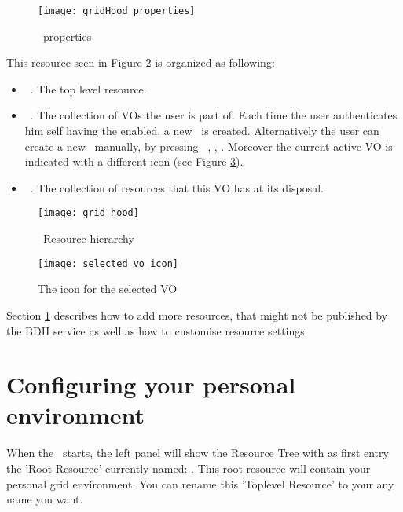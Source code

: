  \begin{figure}[htbp]
  \centerline{\texttt{[image: gridHood\_properties]}}
  \caption{\GridHood\ properties}
  \label{fig:gridHood_properties}
 \end{figure}

 This resource seen in Figure \ref{fig:grid_hood} is organized as following: 
\begin{itemize}
  \item \GridHood\ . The top level resource.
  \item \VOGroup\ . The collection of VOs the user is part of. Each time the user authenticates 
                    him self having the  enabled, a new \VOGroup\ is created. 
                    Alternatively the user can create a new \VOGroup\ manually, by pressing \rightclick\ ,
                     , . Moreover the current active VO is indicated with a different 
                     icon (see Figure \ref{fig:selected_vo_icon}).
  \item \VO\ . The collection of resources that this VO has at its disposal.
\end{itemize} 

 \begin{figure}[htbp]
  \centerline{\texttt{[image: grid\_hood]}}
  \caption{\GridHood\ Resource hierarchy}
  \label{fig:grid_hood}
 \end{figure}

 \begin{figure}[htbp]
  \centerline{\texttt{[image: selected\_vo\_icon]}}
  \caption{The icon for the selected VO}
  \label{fig:selected_vo_icon}
 \end{figure}
 
Section \ref{section:configuring_myvle} describes how to add more resources, that might not be published by the BDII service as well as how to customise resource settings.

\section{Configuring your personal environment}
\label{section:configuring_myvle}

 When the \vbrowser\ starts, the left panel will show the Resource Tree with
 as first entry the 'Root Resource' currently named:  \myvle. 
 This root resource will contain your personal grid environment. You can rename
 this 'Toplevel Resource' to your any name you want. 

